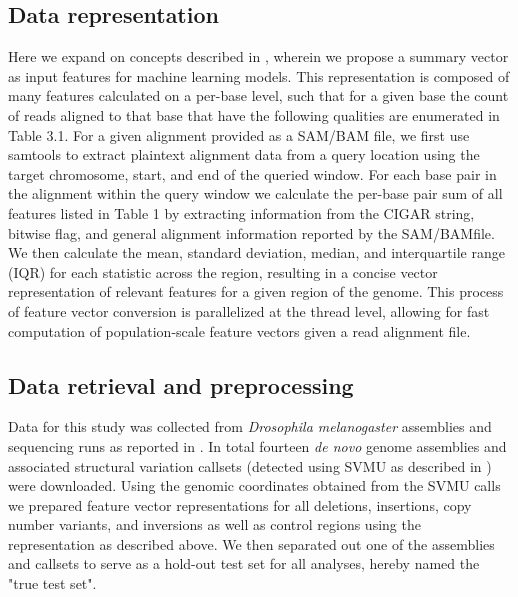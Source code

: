 \subsection{Data representation}

Here we expand on concepts described in \cite{hillDeepLearningApproach2019}, wherein we propose a summary vector as input features for machine learning models. This representation is composed of many features calculated on a per-base level, such that for a given base the count of reads aligned to that base that have the following qualities are enumerated in Table 3.1. For a given alignment provided as a SAM/BAM file, we first use samtools \cite{danecekTwelveYearsSAMtools2021} to extract plaintext alignment data from a query location using the target chromosome, start, and end of the queried window. For each base pair in the alignment within the query window we calculate the per-base pair sum of all features listed in Table 1 by extracting information from the CIGAR string, bitwise flag, and general alignment information reported by the SAM/BAMfile. We then calculate the mean, standard deviation, median, and interquartile range (IQR) for each statistic across the region, resulting in a concise vector representation of relevant features for a given region of the genome. This process of feature vector conversion is parallelized at the thread level, allowing for fast computation of population-scale feature vectors given a read alignment file.



\subsection{Data retrieval and preprocessing}
Data for this study was collected from \textit{Drosophila melanogaster} assemblies and sequencing runs as reported in \cite{chakrabortyEvolutionGenomeStructure2021,chakrabortyHiddenGeneticVariation2018,chakrabortyStructuralVariantsExhibit2019}. In total fourteen \textit{de novo} genome assemblies and associated structural variation callsets (detected using SVMU as described in \cite{chakrabortyStructuralVariantsExhibit2019}) were downloaded. Using the genomic coordinates obtained from the SVMU calls we prepared feature vector representations for all deletions, insertions, copy number variants, and inversions as well as control regions using the representation as described above. We then separated out one of the assemblies and callsets to serve as a hold-out test set for all analyses, hereby named the "true test set".

